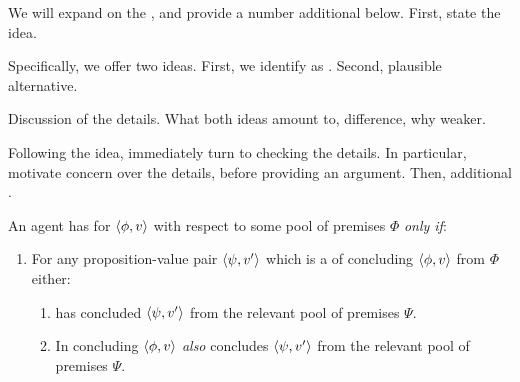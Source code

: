 \begin{note}
  We will expand on the , and provide a number additional  below.
  First, state the idea.

  Specifically, we offer two ideas.
  First, we identify as \csN{}.
  Second, plausible alternative.

  Discussion of the details.
  What both ideas amount to, difference, why weaker.

  Following the idea, immediately turn to checking the details.
  In particular, motivate concern over the details, before providing an argument.
  Then, additional .
\end{note}

\begin{note}
  \begin{idea}[\Zs{-} --- \Zs{}]
    \label{idea:Zs:overview}
    An agent \vAgent{} has \Zs{} for \(\langle \phi, v \rangle\) with respect to some pool of premises \(\Phi\) \emph{only if}:
    \begin{enumerate}[label=\arabic*., ref=\named{CS:\arabic*}]
    \item
      \label{idea:Zs:overview:requ}
      For any proposition-value pair \(\langle \psi, v' \rangle\) which is a \requ{} of concluding \(\langle \phi, v \rangle\) from \(\Phi\) either:
      \begin{enumerate}[label=\alph*., ref=\named{CS:1.\alph*}]
      \item
        \label{idea:Zs:overview:requ-sat:Past}
        \vAgent{} has concluded \(\langle \psi, v' \rangle\) from the relevant pool of premises \(\Psi\).
      \item
        \label{idea:Zs:overview:requ-sat:Pres}
        In concluding \(\langle \phi, v \rangle\) \vAgent{} \emph{also} concludes \(\langle \psi, v' \rangle\) from the relevant pool of premises \(\Psi\).
      \end{enumerate}
    \end{enumerate}
    \vspace{-\baselineskip}
  \end{idea}
\end{note}

